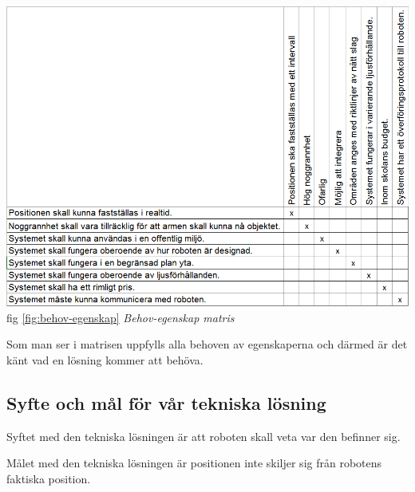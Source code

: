 \documentclass[11pt, a4paper]{report}
\begin{document}
\includegraphics[scale=0.5]{behov-egenskap-matris.PNG}\\
fig \ref{fig:behov-egenskap} \textit{Behov-egenskap matris} %

Som man ser i matrisen uppfylls alla behoven av egenskaperna och därmed är det känt vad en lösning kommer att behöva.



\subsection{Syfte och mål för vår tekniska lösning}
Syftet med den tekniska lösningen är att roboten skall veta var den befinner sig.

Målet med den tekniska lösningen är positionen inte skiljer sig från robotens faktiska position.

\end{document}
